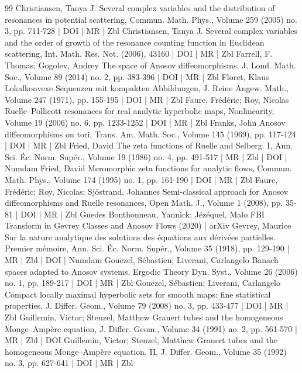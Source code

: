 \begin{thebibliography}{99}
 Christiansen, Tanya J. Several complex variables and the distribution of resonances in potential scattering, Commun. Math. Phys., Volume 259 (2005) no. 3, pp. 711-728 | DOI | MR | Zbl
 Christiansen, Tanya J. Several complex variables and the order of growth of the resonance counting function in Euclidean scattering, Int. Math. Res. Not. (2006), 43160 | DOI | MR | Zbl
 Farrell, F. Thomas; Gogolev, Andrey The space of Anosov diffeomorphisms, J. Lond. Math. Soc., Volume 89 (2014) no. 2, pp. 383-396 | DOI | MR | Zbl
 Floret, Klaus Lokalkonvexe Sequenzen mit kompakten Abbildungen, J. Reine Angew. Math., Volume 247 (1971), pp. 155-195 | DOI | MR | Zbl
 Faure, Frédéric; Roy, Nicolas Ruelle–Pollicott resonances for real analytic hyperbolic maps, Nonlinearity, Volume 19 (2006) no. 6, pp. 1233-1252 | DOI | MR | Zbl
 Franks, John Anosov diffeomorphisms on tori, Trans. Am. Math. Soc., Volume 145 (1969), pp. 117-124 | DOI | MR | Zbl
 Fried, David The zeta functions of Ruelle and Selberg. I, Ann. Sci. Éc. Norm. Supér., Volume 19 (1986) no. 4, pp. 491-517 | MR | Zbl | DOI | Numdam
 Fried, David Meromorphic zeta functions for analytic flows, Commun. Math. Phys., Volume 174 (1995) no. 1, pp. 161-190 | DOI | MR | Zbl
 Faure, Frédéric; Roy, Nicolas; Sjöstrand, Johannes Semi-classical approach for Anosov diffeomorphisms and Ruelle resonances, Open Math. J., Volume 1 (2008), pp. 35-81 | DOI | MR | Zbl
 Guedes Bonthonneau, Yannick; Jézéquel, Malo FBI Transform in Gevrey Classes and Anosov Flows (2020) | arXiv
 Gevrey, Maurice Sur la nature analytique des solutions des équations aux dérivées partielles. Premier mémoire, Ann. Sci. Éc. Norm. Supér., Volume 35 (1918), pp. 129-190 | MR | Zbl | DOI | Numdam
 Gouëzel, Sébastien; Liverani, Carlangelo Banach spaces adapted to Anosov systems, Ergodic Theory Dyn. Syst., Volume 26 (2006) no. 1, pp. 189-217 | DOI | MR | Zbl
 Gouëzel, Sébastien; Liverani, Carlangelo Compact locally maximal hyperbolic sets for smooth maps: fine statistical properties, J. Differ. Geom., Volume 79 (2008) no. 3, pp. 433-477 | DOI | MR | Zbl
 Guillemin, Victor; Stenzel, Matthew Grauert tubes and the homogeneous Monge–Ampère equation, J. Differ. Geom., Volume 34 (1991) no. 2, pp. 561-570 | MR | Zbl | DOI
 Guillemin, Victor; Stenzel, Matthew Grauert tubes and the homogeneous Monge–Ampère equation. II, J. Differ. Geom., Volume 35 (1992) no. 3, pp. 627-641 | DOI | MR | Zbl

\end{thebibliography}

